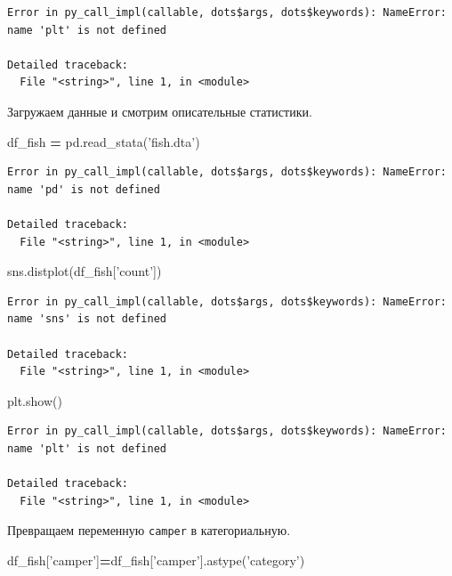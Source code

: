 \documentclass[]{book}
\newenvironment{Shaded}{\begin{snugshade}}{\end{snugshade}}
\newcommand{\NormalTok}[1]{#1}
\newcommand{\OperatorTok}[1]{\textcolor[rgb]{0.81,0.36,0.00}{\textbf{#1}}}
\newcommand{\StringTok}[1]{\textcolor[rgb]{0.31,0.60,0.02}{#1}}
\begin{document}
\begin{verbatim}
Error in py_call_impl(callable, dots$args, dots$keywords): NameError: name 'plt' is not defined

Detailed traceback: 
  File "<string>", line 1, in <module>
\end{verbatim}

Загружаем данные и смотрим описательные статистики.

\begin{Shaded}
\begin{Highlighting}[]
\NormalTok{df_fish }\OperatorTok{=}\NormalTok{ pd.read_stata(}\StringTok{'fish.dta'}\NormalTok{)}
\end{Highlighting}
\end{Shaded}

\begin{verbatim}
Error in py_call_impl(callable, dots$args, dots$keywords): NameError: name 'pd' is not defined

Detailed traceback: 
  File "<string>", line 1, in <module>
\end{verbatim}

\begin{Shaded}
\begin{Highlighting}[]
\NormalTok{sns.distplot(df_fish[}\StringTok{'count'}\NormalTok{])}
\end{Highlighting}
\end{Shaded}

\begin{verbatim}
Error in py_call_impl(callable, dots$args, dots$keywords): NameError: name 'sns' is not defined

Detailed traceback: 
  File "<string>", line 1, in <module>
\end{verbatim}

\begin{Shaded}
\begin{Highlighting}[]
\NormalTok{plt.show()}
\end{Highlighting}
\end{Shaded}

\begin{verbatim}
Error in py_call_impl(callable, dots$args, dots$keywords): NameError: name 'plt' is not defined

Detailed traceback: 
  File "<string>", line 1, in <module>
\end{verbatim}

Превращаем переменную \texttt{camper} в категориальную.

\begin{Shaded}
\begin{Highlighting}[]
\NormalTok{df_fish[}\StringTok{'camper'}\NormalTok{]}\OperatorTok{=}\NormalTok{df_fish[}\StringTok{'camper'}\NormalTok{].astype(}\StringTok{'category'}\NormalTok{)}
\end{Highlighting}
\end{Shaded}
\end{document}

